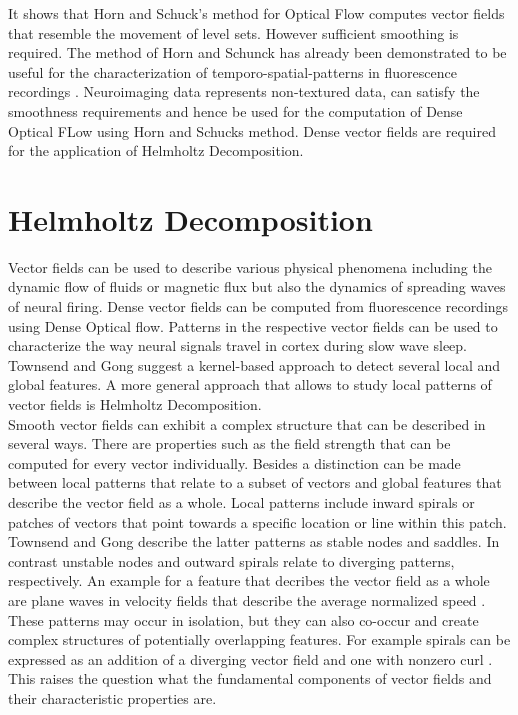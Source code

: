 It shows that Horn and Schuck’s method for Optical Flow computes vector fields that resemble the movement of level sets. However sufficient smoothing is required. The method of Horn and Schunck \parencite*{ horn1981determining} has already been demonstrated to be useful for the characterization of temporo-spatial-patterns in fluorescence recordings \parencite{townsend2018detection}. Neuroimaging data represents non-textured data, can satisfy the smoothness requirements and hence be used for the computation of Dense Optical FLow using Horn and Schucks method. Dense vector fields are required for the application of Helmholtz Decomposition.
\section{Helmholtz Decomposition}
Vector fields can be used to describe various physical phenomena including the dynamic flow of fluids or magnetic flux but also the dynamics of spreading waves of neural firing. Dense vector fields can be computed from fluorescence recordings using Dense Optical flow. Patterns in the respective vector fields can be used to characterize the way neural signals travel in cortex during slow wave sleep. Townsend and Gong \parencite*{townsend2018detection} suggest a kernel-based approach to detect several local and global features. A more general approach that allows to study local patterns of vector fields is Helmholtz Decomposition. \\
Smooth vector fields can exhibit a complex structure that can be described in several ways. There are properties such as the field strength that can be computed for every vector individually. Besides a distinction can be made between local patterns that relate to a subset of vectors and global features that describe the vector field as a whole. Local patterns include inward spirals or patches of vectors that point towards a specific location or line within this patch. Townsend and Gong \parencite*{townsend2018detection} describe the latter patterns as stable nodes and saddles. In contrast unstable nodes and outward spirals relate to diverging patterns, respectively. An example for a feature that decribes the vector field as a whole are plane waves in velocity fields that describe the average normalized speed \parencite{townsend2018detection}. These patterns may occur in isolation, but they can also co-occur and create complex structures of potentially overlapping features. For example spirals can be expressed as an addition of a diverging vector field and one with nonzero curl \parencite{cedmav2020natural}. This raises the question what the fundamental components of vector fields and their characteristic properties are.\\

